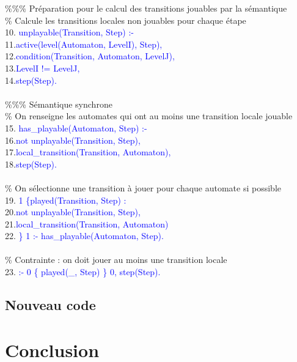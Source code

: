 \documentclass[12pt,a4paper]{article}
\begin{document}
{	\%\%\% Préparation pour le calcul des transitions jouables par la sémantique\\
	\% Calcule les transitions locales non jouables pour chaque étape\\
	10. \textcolor{blue}{unplayable(Transition, Step) :-}\\
	11.\qquad\qquad\textcolor{blue}{active(level(Automaton, LevelI), Step),}\\
	12.\qquad\qquad\textcolor{blue}{condition(Transition, Automaton, LevelJ),}\\
	13.\qquad\qquad\textcolor{blue}{LevelI != LevelJ,}\\
	14.\qquad\qquad\textcolor{blue}{step(Step).}\\ \\
	\%\%\% Sémantique synchrone\\
	\% On renseigne les automates qui ont au moins une transition locale jouable\\
	15. \textcolor{blue}{has\_playable(Automaton, Step) :-}\\
	16.\qquad\qquad\textcolor{blue}{not unplayable(Transition, Step),}\\
	17.\qquad\qquad\textcolor{blue}{local\_transition(Transition, Automaton),}\\
	18.\qquad\qquad\textcolor{blue}{step(Step).}\\ \\
	\% On sélectionne une transition à jouer pour chaque automate si possible\\
	19. \textcolor{blue}{1 \{played(Transition, Step) :}\\
	20.\qquad\qquad\textcolor{blue}{not unplayable(Transition, Step),}\\
	21.\qquad\qquad\textcolor{blue}{local\_transition(Transition, Automaton)}\\
	22. \textcolor{blue}{\} 1 :- has\_playable(Automaton, Step).}\\ \\
	\% Contrainte : on doit jouer au moins une transition locale\\
	23. \textcolor{blue}{:- 0 \{ played(\_, Step) \} 0, step(Step).}\\
}
\subsection{Nouveau code}

\section{Conclusion}

\newpage

\end{document}
